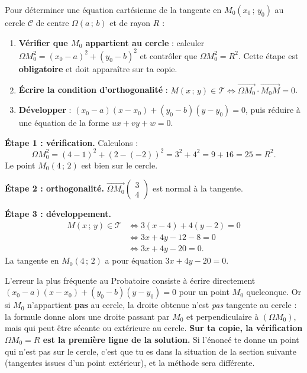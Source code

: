 \documentclass[11pt]{article}
\begin{document}
\begin{methode}
Pour déterminer une équation cartésienne de la tangente en $M_0(x_0\,;\,y_0)$ au cercle $\mathcal{C}$ de centre $\Omega(a\,;\,b)$ et de rayon $R$ :
\begin{enumerate}
\item \textbf{Vérifier que $M_0$ appartient au cercle} : calculer $\Omega M_0^2 = (x_0 - a)^2 + (y_0 - b)^2$ et contrôler que $\Omega M_0^2 = R^2$. Cette étape est \textbf{obligatoire} et doit apparaître sur ta copie.
\item \textbf{Écrire la condition d'orthogonalité} : $M(x\,;\,y) \in \mathcal{T} \iff \overrightarrow{\Omega M_0}\cdot\overrightarrow{M_0 M} = 0$.
\item \textbf{Développer} : $(x_0 - a)(x - x_0) + (y_0 - b)(y - y_0) = 0$, puis réduire à une équation de la forme $ux + vy + w = 0$.
\end{enumerate}
\end{methode}

\begin{exemplebox}
\textbf{Étape 1 : vérification.} Calculons :
\[ \Omega M_0^2 = (4 - 1)^2 + (2 - (-2))^2 = 3^2 + 4^2 = 9 + 16 = 25 = R^2. \]
Le point $M_0(4\,;\,2)$ est bien sur le cercle.

\textbf{Étape 2 : orthogonalité.} $\overrightarrow{\Omega M_0}\begin{pmatrix} 3 \\ 4 \end{pmatrix}$ est normal à la tangente.

\textbf{Étape 3 : développement.}
\begin{align*}
M(x\,;\,y) \in \mathcal{T} &\iff 3(x - 4) + 4(y - 2) = 0 \\
&\iff 3x + 4y - 12 - 8 = 0 \\
&\iff 3x + 4y - 20 = 0.
\end{align*}
La tangente en $M_0(4\,;\,2)$ a pour équation $3x + 4y - 20 = 0$.
\end{exemplebox}

\begin{attention}
L'erreur la plus fréquente au Probatoire consiste à écrire directement $(x_0 - a)(x - x_0) + (y_0 - b)(y - y_0) = 0$ pour un point $M_0$ quelconque. Or si $M_0$ n'appartient \textbf{pas} au cercle, la droite obtenue n'est \emph{pas} tangente au cercle : la formule donne alors une droite passant par $M_0$ et perpendiculaire à $(\Omega M_0)$, mais qui peut être sécante ou extérieure au cercle. \textbf{Sur ta copie, la vérification $\Omega M_0 = R$ est la première ligne de la solution.} Si l'énoncé te donne un point qui n'est pas sur le cercle, c'est que tu es dans la situation de la section suivante (tangentes issues d'un point extérieur), et la méthode sera différente.
\end{attention}
\end{document}
